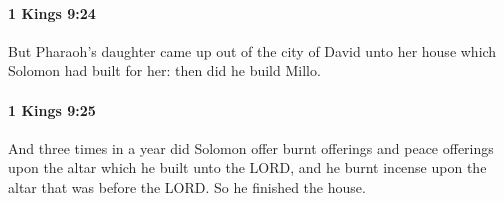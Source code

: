 		\paragraph{1 Kings 9:24} %
			\label{1KINGS-9-24}

			But Pharaoh’s daughter came up out of the city of David unto her house which Solomon had built for her: then did he build Millo.


		\paragraph{1 Kings 9:25} %
			\label{1KINGS-9-25}

			And three times in a year did Solomon offer burnt offerings and peace offerings upon the altar which he built unto the LORD, and he burnt incense upon the altar that was before the LORD. So he finished the house.


